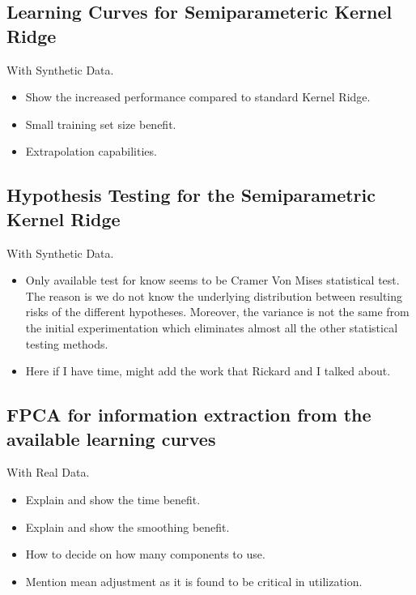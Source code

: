\subsection{Learning Curves for Semiparameteric Kernel Ridge}\label{app:1}
With Synthetic Data.
\begin{itemize}
  \item Show the increased performance compared to standard Kernel Ridge.
  \item Small training set size benefit.
  \item Extrapolation capabilities.
\end{itemize}

\subsection{Hypothesis Testing for the Semiparametric Kernel Ridge}\label{app:2}
With Synthetic Data.
\begin{itemize}
  \item Only available test for know seems to be Cramer Von Mises statistical test. The reason is we do not know the underlying distribution between resulting risks of the different hypotheses. Moreover, the variance is not the same from the initial experimentation which eliminates almost all the other statistical testing methods.
  \item Here if I have time, might add the work that Rickard and I talked about.
\end{itemize}

\subsection{FPCA for information extraction from the available learning curves}\label{app:3}

With Real Data.
\begin{itemize}
  \item Explain and show the time benefit.
  \item Explain and show the smoothing benefit.
  \item How to decide on how many components to use.
  \item Mention mean adjustment as it is found to be critical in utilization.
\end{itemize}



